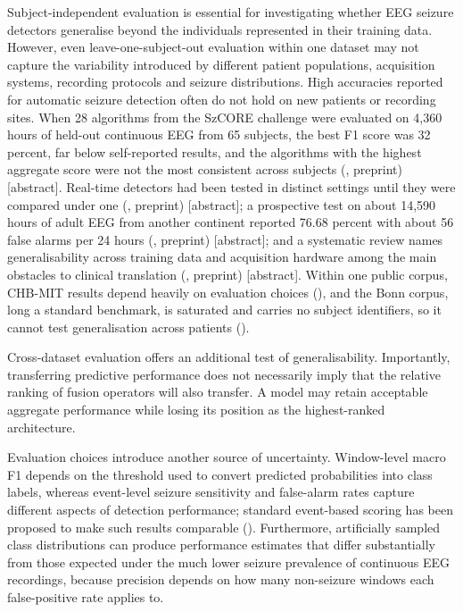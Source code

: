 \documentclass[11pt,a4paper]{article}
\begin{document}
Subject-independent evaluation is essential for investigating whether EEG seizure
detectors generalise beyond the individuals represented in their training data. However,
even leave-one-subject-out evaluation within one dataset may not capture the variability
introduced by different patient populations, acquisition systems, recording protocols
and seizure distributions. High accuracies reported for automatic seizure detection often
do not hold on new patients or recording sites. When 28 algorithms from the SzCORE
challenge were evaluated on 4,360 hours of held-out continuous EEG from 65 subjects, the
best F1 score was 32 percent, far below self-reported results, and the algorithms with
the highest aggregate score were not the most consistent across subjects (\citealp{Dan2025arxiv}, preprint) {[}abstract{]}. Real-time detectors had been tested in distinct settings
until they were compared under one (\citealp{Lee2022arxiv}, preprint) {[}abstract{]}; a prospective
test on about 14,590 hours of adult EEG from another continent reported 76.68 percent
with about 56 false alarms per 24 hours (\citealp{Yang2021arxiv}, preprint) {[}abstract{]}; and a
systematic review names generalisability across training data and acquisition hardware
among the main obstacles to clinical translation (\citealp{Moutonnet2024arxiv}, preprint)
{[}abstract{]}. Within one public corpus, CHB-MIT results depend heavily on evaluation
choices (\citealp{Ali_2024}), and the Bonn corpus, long a standard benchmark, is saturated
and carries no subject identifiers, so it cannot test generalisation across patients
(\citealp{Kontras_2026}).

Cross-dataset evaluation offers an additional test of generalisability. Importantly,
transferring predictive performance does not necessarily imply that the relative ranking
of fusion operators will also transfer. A model may retain acceptable aggregate
performance while losing its position as the highest-ranked architecture.

Evaluation choices introduce another source of uncertainty. Window-level macro F1
depends on the threshold used to convert predicted probabilities into class labels,
whereas event-level seizure sensitivity and false-alarm rates capture different aspects
of detection performance; standard event-based scoring has been proposed to make such
results comparable (\citealp{Dan_2024}). Furthermore, artificially sampled class
distributions can produce performance estimates that differ substantially from those
expected under the much lower seizure prevalence of continuous EEG recordings, because
precision depends on how many non-seizure windows each false-positive rate applies to.
\end{document}
